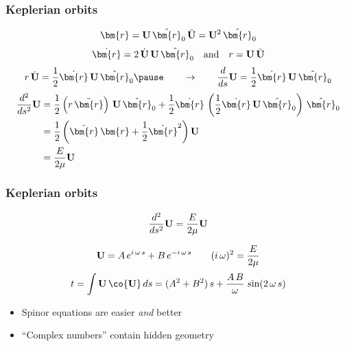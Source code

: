 \documentclass[12pt,xcolor={dvipsnames}]{beamer}
\renewcommand{\vec}{\bm}
\newcommand{\quat}[1]{\ensuremath{\mathbf{\MakeUppercase{#1}}}}
\begin{document}
\begin{frame}
\end{frame}

\begin{frame}
  \frametitle{Keplerian orbits}
  \begin{equation*}
    \vec{r} = \quat{U}\, \hat{\vec{r}}_0\, \bar{\quat{U}} =
    \quat{U}^{2}\, \hat{\vec{r}}_0
  \end{equation*}
  \pause
  \begin{equation*}
    \dot{\vec{r}} = 2\, \dot{\quat{U}}\, \quat{U}\, \hat{\vec{r}}_0
    \quad \text{and} \quad r = \quat{U}\, \bar{\quat{U}}
  \end{equation*}
  \pause
  \begin{equation*}
    r\, \dot{\quat{U}} = \frac{1}{2} \dot{\vec{r}}\, \quat{U}\,
    \hat{\vec{r}}_0 \pause \qquad \rightarrow \qquad \frac{d}{ds}
    \quat{U} = \frac{1}{2} \dot{\vec{r}}\, \quat{U}\, \hat{\vec{r}}_0
  \end{equation*}
  \pause
  \begin{align*}
    \frac{d^{2}}{ds^{2}} \quat{U} %
    &= \frac{1}{2} \left( r\, \ddot{\vec{r}} \right)\, \quat{U}\,
    \hat{\vec{r}}_0 + \frac{1}{2} \dot{\vec{r}}\, \left( \frac{1}{2}
      \dot{\vec{r}}\, \quat{U}\, \hat{\vec{r}}_0 \right)\,
    \hat{\vec{r}}_0 \\ %
    &= \frac{1}{2} \left( \ddot{\vec{r}}\, \vec{r} + \frac{1}{2}
      \dot{\vec{r}}^{2} \right) \quat{U} \\ %
    &= \frac{E}{2\mu} \quat{U}
  \end{align*}
\end{frame}

\begin{frame}
  \frametitle{Keplerian orbits}
  \begin{equation*}
    \frac{d^{2}}{ds^{2}} \quat{U} = \frac{E}{2\mu} \quat{U}
  \end{equation*}

  \pause
  \begin{equation*}
    \quat{U} = A\, e^{i\, \omega\, s} + B\, e^{-i\, \omega\, s}
    \qquad
    (i\, \omega)^{2} = \frac{E}{2\mu}
  \end{equation*}
  \pause
  \begin{equation*}
    t = \int \quat{U}\, \co{\quat{U}}\, ds = (A^{2}+B^{2})\, s +
    \frac{A\,B}{\omega}\, \sin (2\,\omega\,s)
  \end{equation*}

  \pause
  \begin{itemize}
   \item Spinor equations are easier \emph{and} better
   \item ``Complex numbers'' contain hidden geometry
  \end{itemize}
\end{frame}
\end{document}
